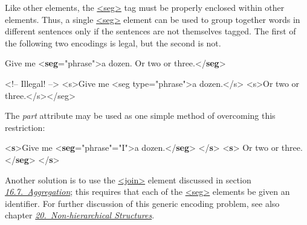 Like other elements, the \hyperref[TEI.seg]{<seg>} tag must be properly enclosed within other elements. Thus, a single \hyperref[TEI.seg]{<seg>} element can be used to group together words in different sentences only if the sentences are not themselves tagged. The first of the following two encodings is legal, but the second is not.  \par\bgroup{}\exampleFont \begin{shaded}\noindent\mbox{}Give me {<\textbf{seg}\hspace*{1em}{type}="{phrase}">}a dozen. Or two or three.{</\textbf{seg}>}\end{shaded}\egroup\par \noindent  \par\hfill\bgroup\exampleFont\vskip 10pt\begin{shaded}
\obeyspaces <!-- Illegal! -->\newline
<s>Give me <seg type="phrase">a dozen.</s>\newline
<s>Or two or three.</s></seg>\end{shaded}
\par\egroup 
\par
The {\itshape part} attribute may be used as one simple method of overcoming this restriction: \par\bgroup{}\exampleFont \begin{shaded}\noindent\mbox{}{<\textbf{s}>}Give me {<\textbf{seg}\hspace*{1em}{type}="{phrase}"\hspace*{1em}{part}="{I}">}a dozen.{</\textbf{seg}>}\mbox{}\newline 
{</\textbf{s}>}\mbox{}\newline 
{<\textbf{s}>}\mbox{}\newline 
{}Or two or three.{</\textbf{seg}>}\mbox{}\newline 
{</\textbf{s}>}\end{shaded}\egroup\par \noindent  Another solution is to use the \hyperref[TEI.join]{<join>} element discussed in section \textit{\hyperref[SAAG]{16.7.\ Aggregation}}; this requires that each of the \hyperref[TEI.seg]{<seg>} elements be given an identifier. For further discussion of this generic encoding problem, see also chapter \textit{\hyperref[NH]{20.\ Non-hierarchical Structures}}.\par
